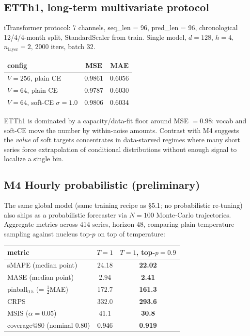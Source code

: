 \documentclass[11pt]{article}
\theoremstyle{remark}
\begin{document}
\subsection{ETTh1, long-term multivariate protocol}

iTransformer protocol: 7 channels, seq\_len = 96, pred\_len = 96,
chronological 12/4/4-month split, StandardScaler from train. Single
model, $d = 128$, $h = 4$, $n_{\text{layer}} = 2$, 2000 iters, batch 32.

\begin{center}
\begin{tabular}{lcc}
\toprule
config & MSE & MAE \\
\midrule
$V = 256$, plain CE                 & 0.9861 & 0.6056 \\
$V = 64$, plain CE                  & 0.9787 & 0.6030 \\
$V = 64$, soft-CE $\sigma = 1.0$    & 0.9806 & 0.6034 \\
\bottomrule
\end{tabular}
\end{center}

ETTh1 is dominated by a capacity/data-fit floor around MSE $= 0.98$:
vocab and soft-CE move the number by within-noise amounts. Contrast
with M4 suggests the \emph{value} of soft targets concentrates in
data-starved regimes where many short series force extrapolation of
conditional distributions without enough signal to localize a single
bin.

\subsection{M4 Hourly probabilistic (preliminary)}
\label{sec:prob-m4}

The same global model (same training recipe as \S5.1; no probabilistic
re-tuning) also ships as a probabilistic forecaster via $N = 100$
Monte-Carlo trajectories. Aggregate metrics across 414 series,
horizon 48, comparing plain temperature sampling against nucleus
top-$p$ on top of temperature:

\begin{center}
\begin{tabular}{lcc}
\toprule
metric & $T=1$ & $T=1$, top-$p=0.9$ \\
\midrule
sMAPE (median point) & 24.18 & \textbf{22.02} \\
MASE (median point) & 2.94 & \textbf{2.41} \\
pinball$_{0.5}$ (= $\tfrac{1}{2}$MAE) & 172.7 & \textbf{161.3} \\
CRPS & 332.0 & \textbf{293.6} \\
MSIS ($\alpha = 0.05$) & 41.1 & \textbf{30.8} \\
coverage@80 (nominal 0.80) & 0.946 & \textbf{0.919} \\
\bottomrule
\end{tabular}
\end{center}
\end{document}

